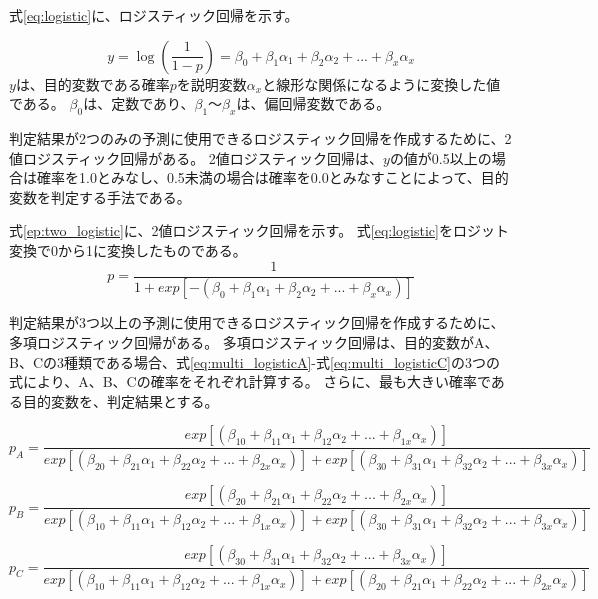式\ref{eq:logistic}に、ロジスティック回帰を示す。

\begin{equation}\label{eq:logistic}
    y = \log{(\frac{1}{1-p})}= \beta_{0}+ \beta_{1}\alpha_{1}+\beta_{2}\alpha_{2}+...+\beta_{x}\alpha_{x}
\end{equation}
$y$は、目的変数である確率$p$を説明変数$\alpha_{x}$と線形な関係になるように変換した値である。
$\beta_{0}$は、定数であり、$\beta_{1}～\beta_{x}$は、偏回帰変数である。

判定結果が2つのみの予測に使用できるロジスティック回帰を作成するために、2値ロジスティック回帰がある\cite{two_logistic}。
2値ロジスティック回帰は、$y$の値が0.5以上の場合は確率を1.0とみなし、0.5未満の場合は確率を0.0とみなすことによって、目的変数を判定する手法である。

式\ref{ep:two_logistic}に、2値ロジスティック回帰を示す。
式\ref{eq:logistic}をロジット変換で0から1に変換したものである。
\begin{equation}\label{eq:two_logistic}
    p = \frac{1}{1+exp[- (\beta_{0}+ \beta_{1}\alpha_{1}+\beta_{2}\alpha_{2}+...+\beta_{x}\alpha_{x})]}
\end{equation}

判定結果が3つ以上の予測に使用できるロジスティック回帰を作成するために、多項ロジスティック回帰がある\cite{multinomial_logistic}。
多項ロジスティック回帰は、目的変数がA、B、Cの3種類である場合、式\ref{eq:multi_logisticA}-式\ref{eq:multi_logisticC}の3つの式により、A、B、Cの確率をそれぞれ計算する。
さらに、最も大きい確率である目的変数を、判定結果とする。

\begin{equation}\label{eq:multi_logisticA}
    p_{A} = \frac{exp[(\beta_{10}+ \beta_{11}\alpha_{1}+\beta_{12}\alpha_{2}+...+\beta_{1x}\alpha_{x})]}{exp[(\beta_{20}+ \beta_{21}\alpha_{1}+\beta_{22}\alpha_{2}+...+\beta_{2x}\alpha_{x})]+exp[(\beta_{30}+ \beta_{31}\alpha_{1}+\beta_{32}\alpha_{2}+...+\beta_{3x}\alpha_{x})]}
\end{equation}

\begin{equation}\label{eq:multi_logisticB}
    p_{B} = \frac{exp[(\beta_{20}+ \beta_{21}\alpha_{1}+\beta_{22}\alpha_{2}+...+\beta_{2x}\alpha_{x})]}{exp[(\beta_{10}+ \beta_{11}\alpha_{1}+\beta_{12}\alpha_{2}+...+\beta_{1x}\alpha_{x})]+exp[(\beta_{30}+ \beta_{31}\alpha_{1}+\beta_{32}\alpha_{2}+...+\beta_{3x}\alpha_{x})]}
\end{equation}

\begin{equation}\label{eq:multi_logisticC}
    p_{C} = \frac{exp[(\beta_{30}+ \beta_{31}\alpha_{1}+\beta_{32}\alpha_{2}+...+\beta_{3x}\alpha_{x})]}{exp[(\beta_{10}+ \beta_{11}\alpha_{1}+\beta_{12}\alpha_{2}+...+\beta_{1x}\alpha_{x})]+exp[(\beta_{20}+ \beta_{21}\alpha_{1}+\beta_{22}\alpha_{2}+...+\beta_{2x}\alpha_{x})]}
\end{equation}

